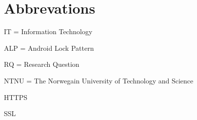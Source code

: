 \section*{Abbrevations}

	IT = Information Technology

	ALP = Android Lock Pattern
	
	RQ = Research Question

	NTNU = The Norwegain University of Technology and Science

	HTTPS

	SSL 